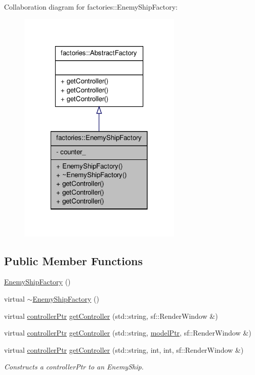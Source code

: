 \-Collaboration diagram for factories\-:\-:\-Enemy\-Ship\-Factory\-:
\nopagebreak
\begin{figure}[H]
\begin{center}
\leavevmode
\includegraphics[width=222pt]{da/d24/classfactories_1_1EnemyShipFactory__coll__graph}
\end{center}
\end{figure}
\subsection*{\-Public \-Member \-Functions}
\begin{DoxyCompactItemize}
\item 
\hyperlink{classfactories_1_1EnemyShipFactory_a8a3299b6fb5a7086ed0a51f201e63212}{\-Enemy\-Ship\-Factory} ()
\item 
virtual \hyperlink{classfactories_1_1EnemyShipFactory_a3fd2b9229516a6fca99d0e7a63436c7a}{$\sim$\-Enemy\-Ship\-Factory} ()
\item 
virtual \hyperlink{Game_8h_a21b04f6cf2d5990b82725fac5ea2ce9a}{controller\-Ptr} \hyperlink{classfactories_1_1EnemyShipFactory_a8185d6544d7c8cb1a8e6fc2c1e7696ec}{get\-Controller} (std\-::string, sf\-::\-Render\-Window \&)
\item 
virtual \hyperlink{Game_8h_a21b04f6cf2d5990b82725fac5ea2ce9a}{controller\-Ptr} \hyperlink{classfactories_1_1EnemyShipFactory_ab4dd55f8e081ae78580f06eaafe6468f}{get\-Controller} (std\-::string, \hyperlink{ModelView_8h_a78966ddb517fca8d2b29a2bc5c31e74e}{model\-Ptr}, sf\-::\-Render\-Window \&)
\item 
virtual \hyperlink{Game_8h_a21b04f6cf2d5990b82725fac5ea2ce9a}{controller\-Ptr} \hyperlink{classfactories_1_1EnemyShipFactory_a582e50c06af8881e4c873f9c20a92557}{get\-Controller} (std\-::string, int, int, sf\-::\-Render\-Window \&)
\begin{DoxyCompactList}\small\item\em \-Constructs a controller\-Ptr to an \-Enemy\-Ship. \end{DoxyCompactList}\end{DoxyCompactItemize}
